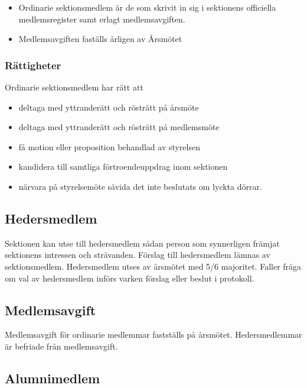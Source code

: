 \documentclass{dgovdoc}
\begin{document}
\begin{itemize}

  \item Ordinarie sektionsmedlem är de som skrivit in sig i sektionens officiella medlemsregister samt erlagt medlemsavgiften.
  \item Medlemsavgiften faställs årligen av Årsmötet

\end{itemize}

\subsubsection{Rättigheter}

Ordinarie sektionsmedlem har rätt att

\begin{itemize}
  \item deltaga med yttranderätt och rösträtt på årsmöte
  \item deltaga med yttranderätt och rösträtt på medlemsmöte
  \item få motion eller proposition behandlad av styrelsen
  \item kandidera till samtliga förtroendeuppdrag inom sektionen
  \item närvara på styrelsemöte såvida det inte beslutats om lyckta dörrar.
\end{itemize}

\subsection{Hedersmedlem}
\label{sec:hedersmedlem}

Sektionen kan utse till hedersmedlem sådan person som synnerligen främjat
sektionens intressen och strävanden. Förslag till hedersmedlem lämnas av
sektionsmedlem. Hedersmedlem utses av årsmötet med 5/6 majoritet. Faller fråga om val
av hedersmedlem införs varken förslag eller beslut i protokoll.

\subsection{Medlemsavgift}

Medlemsavgift för ordinarie medlemmar fastställs på årsmötet. Hedersmedlemmar är befriade från medlemsavgift.

\subsection{Alumnimedlem}
\label{sec:alumnimedlem}
\end{document}
